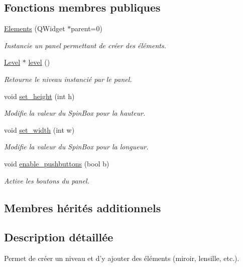 \subsection*{Fonctions membres publiques}
\begin{DoxyCompactItemize}
\item 
\hyperlink{classElements_a2b73500c747cc879fe708d35aba45532}{Elements} (Q\+Widget $\ast$parent=0)
\begin{DoxyCompactList}\small\item\em Instancie un panel permettant de créer des éléments. \end{DoxyCompactList}\item 
\hyperlink{classLevel}{Level} $\ast$ \hyperlink{classElements_add91eac75df596342176acac4eb8b1a1}{level} ()
\begin{DoxyCompactList}\small\item\em Retourne le niveau instancié par le panel. \end{DoxyCompactList}\item 
void \hyperlink{classElements_a077b89b923b450bda172001121825e03}{set\+\_\+height} (int h)
\begin{DoxyCompactList}\small\item\em Modifie la valeur du Spin\+Box pour la hauteur. \end{DoxyCompactList}\item 
void \hyperlink{classElements_af6c7af0c40d3840296224453352fc534}{set\+\_\+width} (int w)
\begin{DoxyCompactList}\small\item\em Modifie la valeur du Spin\+Box pour la longueur. \end{DoxyCompactList}\item 
void \hyperlink{classElements_ac8411c290c41dcb1777cb649155d3c04}{enable\+\_\+pushbuttons} (bool b)
\begin{DoxyCompactList}\small\item\em Active les boutons du panel. \end{DoxyCompactList}\end{DoxyCompactItemize}
\subsection*{Membres hérités additionnels}


\subsection{Description détaillée}
Permet de créer un niveau et d’y ajouter des éléments (miroir, lensille, etc.). 

